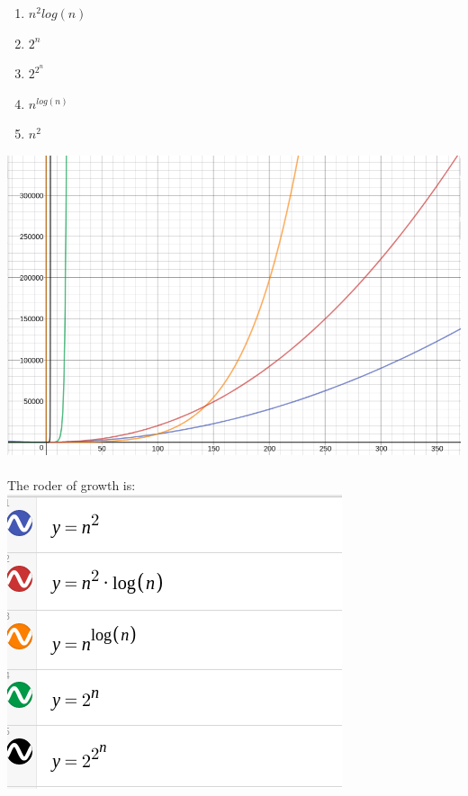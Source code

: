\documentclass[12pt]{article}
\begin{document}
\begin{enumerate}
    \item $n^{2}log(n)$
    \item $2^{n}$
    \item $2^{2^{n}}$
    \item $n^{log(n)}$
    \item $n^{2}$
\end{enumerate}

\includegraphics[width=\textwidth]{Src/Grafica5.png}\\

\\The roder of growth is:\\
\includegraphics[width=\textwidth]{Src/Leyenda2.png}
\end{document}
